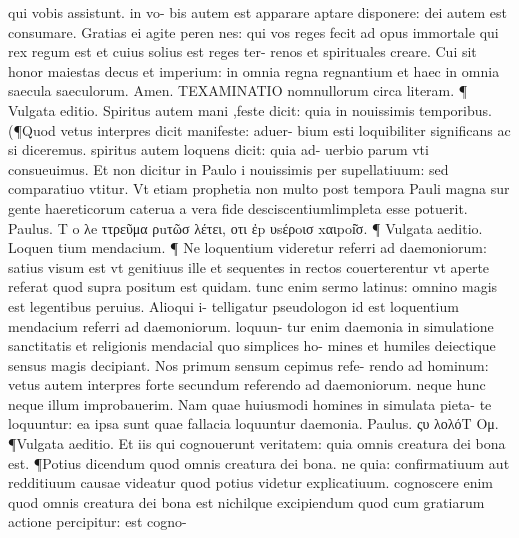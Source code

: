\documentclass{article}
\begin{document}
\begin{pages}
qui vobis assistunt. in vo- bis autem est apparare aptare disponere: dei autem est consumare. Gratias ei agite peren nes: qui vos reges fecit ad opus immortale qui rex regum est et cuius solius est reges ter- renos et spirituales creare. Cui sit honor maiestas decus et imperium: in omnia regna regnantium et haec in omnia saecula saeculorum. Amen.  \pend\pstart TEXAMINATIO nomnullorum circa literam. ¶ Vulgata editio. Spiritus autem mani ,feste dicit: quia in nouissimis temporibus. (¶Quod vetus interpres dicit manifeste: aduer- bium esti loquibiliter significans ac si diceremus. spiritus autem loquens dicit: quia ad- uerbio parum vti consueuimus. Et non dicitur in Paulo i nouissimis per supellatiuum: sed comparatiuo vtitur. Vt etiam prophetia non multo post tempora Pauli magna sur gente haereticorum caterua a vera fide desciscentiumlimpleta esse potuerit. Paulus. T o λe ττρεῦμα ρuτῶσ λέτει, οτι ἐp υsέρoισ xαιpoi͂σ. ¶ Vulgata aeditio. Loquen tium mendacium. ¶ Ne loquentium videretur referri ad daemoniorum: satius visum est vt genitiuus ille et sequentes in rectos couerterentur vt aperte referat quod supra positum est quidam. tunc enim sermo latinus: omnino magis est legentibus peruius. Alioqui i- telligatur pseudologon id est loquentium mendacium referri ad daemoniorum. loquun- tur enim daemonia in simulatione sanctitatis et religionis mendacial quo simplices ho- mines et humiles deiectique sensus magis decipiant. Nos primum sensum cepimus refe- rendo ad hominum: vetus autem interpres forte secundum referendo ad daemoniorum. neque hunc neque illum improbauerim. Nam quae huiusmodi homines in simulata pieta- te loquuntur: ea ipsa sunt quae fallacia loquuntur daemonia. Paulus. ςυ λολόT Oμ.  ¶Vulgata aeditio. Et iis qui cognouerunt veritatem: quia omnis creatura dei bona est. ¶Potius dicendum quod omnis creatura dei bona. ne quia: confirmatiuum aut redditiuum causae videatur quod potius videtur explicatiuum. cognoscere enim quod omnis creatura dei bona est nichilque excipiendum quod cum gratiarum actione percipitur: est cogno-  \pend

\end{pages}
\end{document}
